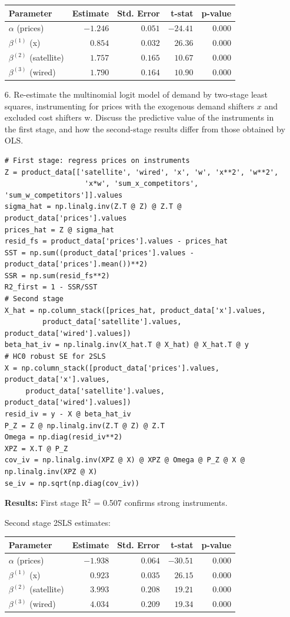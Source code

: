 \documentclass[english,11pt]{article}
\begin{document}
\begin{enumerate}
\begin{center}
\begin{tabular}{lrrrr}
\hline
Parameter & Estimate & Std. Error & t-stat & p-value \\
\hline
$\alpha$ (prices) & $-1.246$ & $0.051$ & $-24.41$ & $0.000$ \\
$\beta^{(1)}$ (x) & $0.854$ & $0.032$ & $26.36$ & $0.000$ \\
$\beta^{(2)}$ (satellite) & $1.757$ & $0.165$ & $10.67$ & $0.000$ \\
$\beta^{(3)}$ (wired) & $1.790$ & $0.164$ & $10.90$ & $0.000$ \\
\hline
\end{tabular}
\end{center}
\item[6.] Re-estimate the multinomial logit model of demand by two-stage
least squares, instrumenting for prices with the exogenous demand shifters $%
x $ and excluded cost shifters w. Discuss the predictive value of the instruments in the first stage, and how the second-stage results differ from those
obtained by OLS. \begin{verbatim}
# First stage: regress prices on instruments
Z = product_data[['satellite', 'wired', 'x', 'w', 'x**2', 'w**2', 
                   'x*w', 'sum_x_competitors', 'sum_w_competitors']].values
sigma_hat = np.linalg.inv(Z.T @ Z) @ Z.T @ product_data['prices'].values
prices_hat = Z @ sigma_hat
resid_fs = product_data['prices'].values - prices_hat
SST = np.sum((product_data['prices'].values - product_data['prices'].mean())**2)
SSR = np.sum(resid_fs**2)
R2_first = 1 - SSR/SST
# Second stage
X_hat = np.column_stack([prices_hat, product_data['x'].values,
         product_data['satellite'].values, product_data['wired'].values])
beta_hat_iv = np.linalg.inv(X_hat.T @ X_hat) @ X_hat.T @ y
# HC0 robust SE for 2SLS
X = np.column_stack([product_data['prices'].values, product_data['x'].values,
     product_data['satellite'].values, product_data['wired'].values])
resid_iv = y - X @ beta_hat_iv
P_Z = Z @ np.linalg.inv(Z.T @ Z) @ Z.T
Omega = np.diag(resid_iv**2)
XPZ = X.T @ P_Z
cov_iv = np.linalg.inv(XPZ @ X) @ XPZ @ Omega @ P_Z @ X @ np.linalg.inv(XPZ @ X)
se_iv = np.sqrt(np.diag(cov_iv))
\end{verbatim}


\textbf{Results:} First stage R$^2$ = 0.507 confirms strong instruments.

Second stage 2SLS estimates:

\begin{center}
\begin{tabular}{lrrrr}
\hline
Parameter & Estimate & Std. Error & t-stat & p-value \\
\hline
$\alpha$ (prices) & $-1.938$ & $0.064$ & $-30.51$ & $0.000$ \\
$\beta^{(1)}$ (x) & $0.923$ & $0.035$ & $26.15$ & $0.000$ \\
$\beta^{(2)}$ (satellite) & $3.993$ & $0.208$ & $19.21$ & $0.000$ \\
$\beta^{(3)}$ (wired) & $4.034$ & $0.209$ & $19.34$ & $0.000$ \\
\hline
\end{tabular}
\end{center}


\end{enumerate}
\end{document}
